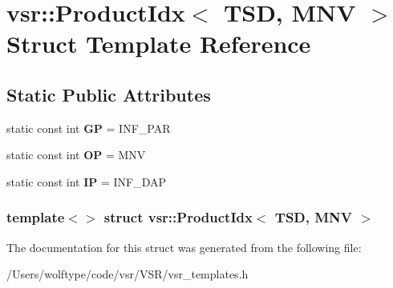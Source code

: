 \hypertarget{structvsr_1_1_product_idx_3_01_t_s_d_00_01_m_n_v_01_4}{\section{vsr\-:\-:Product\-Idx$<$ T\-S\-D, M\-N\-V $>$ Struct Template Reference}
\label{structvsr_1_1_product_idx_3_01_t_s_d_00_01_m_n_v_01_4}
}
\subsection*{Static Public Attributes}
\begin{DoxyCompactItemize}
\item 
\hypertarget{structvsr_1_1_product_idx_3_01_t_s_d_00_01_m_n_v_01_4_ae80d00d005a0725b3863a58bf7dd9077}{static const int {\bfseries G\-P} = I\-N\-F\-\_\-\-P\-A\-R}\label{structvsr_1_1_product_idx_3_01_t_s_d_00_01_m_n_v_01_4_ae80d00d005a0725b3863a58bf7dd9077}

\item 
\hypertarget{structvsr_1_1_product_idx_3_01_t_s_d_00_01_m_n_v_01_4_adc9072a5a623ff871fafc0dd511cf9ab}{static const int {\bfseries O\-P} = M\-N\-V}\label{structvsr_1_1_product_idx_3_01_t_s_d_00_01_m_n_v_01_4_adc9072a5a623ff871fafc0dd511cf9ab}

\item 
\hypertarget{structvsr_1_1_product_idx_3_01_t_s_d_00_01_m_n_v_01_4_ab334a49f83d34cdeddc2d35f19d78504}{static const int {\bfseries I\-P} = I\-N\-F\-\_\-\-D\-A\-P}\label{structvsr_1_1_product_idx_3_01_t_s_d_00_01_m_n_v_01_4_ab334a49f83d34cdeddc2d35f19d78504}

\end{DoxyCompactItemize}
\subsubsection*{template$<$$>$ struct vsr\-::\-Product\-Idx$<$ T\-S\-D, M\-N\-V $>$}



The documentation for this struct was generated from the following file\-:\begin{DoxyCompactItemize}
\item 
/\-Users/wolftype/code/vsr/\-V\-S\-R/vsr\-\_\-templates.\-h\end{DoxyCompactItemize}
